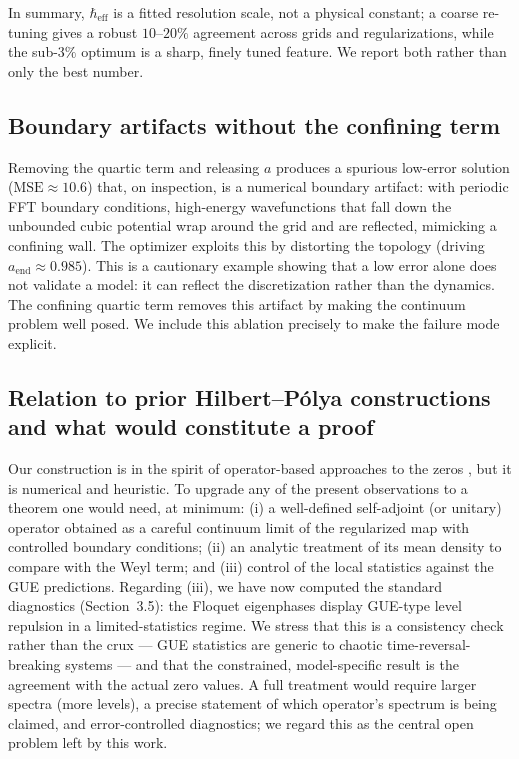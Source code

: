 \documentclass[11pt]{article}
\begin{document}
In summary, $\hbar_{\mathrm{eff}}$ is a fitted resolution scale, not a physical constant; a coarse re-tuning gives a robust $10$--$20\%$ agreement across grids and regularizations, while the sub-$3\%$ optimum is a sharp, finely tuned feature. We report both rather than only the best number.

\subsection{Boundary artifacts without the confining term}

Removing the quartic term and releasing $a$ produces a spurious low-error solution ($\mathrm{MSE}\approx 10.6$) that, on inspection, is a numerical boundary artifact: with periodic FFT boundary conditions, high-energy wavefunctions that fall down the unbounded cubic potential wrap around the grid and are reflected, mimicking a confining wall. The optimizer exploits this by distorting the topology (driving $a_{\mathrm{end}}\approx 0.985$). This is a cautionary example showing that a low error alone does not validate a model: it can reflect the discretization rather than the dynamics. The confining quartic term removes this artifact by making the continuum problem well posed. We include this ablation precisely to make the failure mode explicit.

\subsection{Relation to prior Hilbert--P\'olya constructions and what would constitute a proof}

Our construction is in the spirit of operator-based approaches to the zeros \cite{berry1999,bender2017,connes1999,sierra2008,bishop2019}, but it is numerical and heuristic. To upgrade any of the present observations to a theorem one would need, at minimum: (i) a well-defined self-adjoint (or unitary) operator obtained as a careful continuum limit of the regularized map with controlled boundary conditions; (ii) an analytic treatment of its mean density to compare with the Weyl term; and (iii) control of the local statistics against the GUE predictions. Regarding (iii), we have now computed the standard diagnostics (Section~3.5): the Floquet eigenphases display GUE-type level repulsion in a limited-statistics regime. We stress that this is a consistency check rather than the crux --- GUE statistics are generic to chaotic time-reversal-breaking systems --- and that the constrained, model-specific result is the agreement with the actual zero values. A full treatment would require larger spectra (more levels), a precise statement of which operator's spectrum is being claimed, and error-controlled diagnostics; we regard this as the central open problem left by this work.
\end{document}
